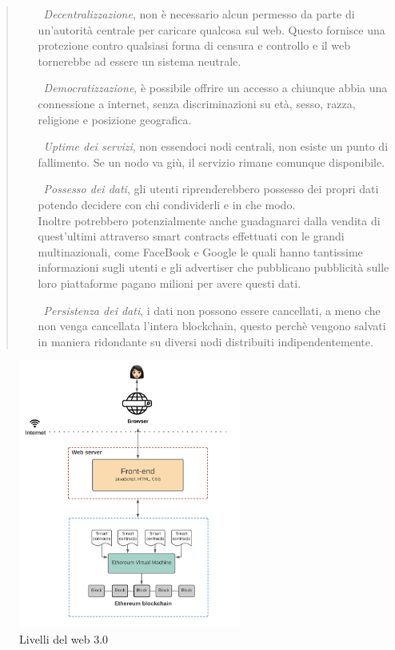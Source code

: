 \begin{quote}
    \begin{itemize}
        \item [\textbullet\ \textit{Decentralizzazione},] non è necessario alcun permesso da parte di un'autorità centrale per caricare qualcosa sul web. Questo fornisce una protezione contro qualsiasi forma di censura e controllo e il web tornerebbe ad essere un sistema neutrale.
        \item [\textbullet\ \textit{Democratizzazione},] è possibile offrire un accesso a chiunque abbia una connessione a internet, senza discriminazioni su età, sesso, razza, religione e posizione geografica.
        \item [\textbullet\ \textit{Uptime dei servizi},] non essendoci nodi centrali, non esiste un punto di fallimento. Se un nodo va giù, il servizio rimane comunque disponibile.
        \item [\textbullet\ \textit{Possesso dei dati},] gli utenti riprenderebbero possesso dei propri dati potendo decidere con chi condividerli e in che modo. 
        \\Inoltre potrebbero potenzialmente anche guadagnarci dalla vendita di quest'ultimi attraverso smart contracts effettuati con le grandi multinazionali, come FaceBook e Google le quali hanno tantissime informazioni sugli utenti e gli advertiser che pubblicano pubblicità sulle loro piattaforme pagano milioni per avere questi dati.
        \item [\textbullet\ \textit{Persistenza dei dati},] i dati non possono essere cancellati, a meno che non venga cancellata l'intera blockchain, questo perchè vengono salvati in maniera ridondante su diversi nodi distribuiti indipendentemente.
    \end{itemize}
\end{quote}
\begin{figure}[h]
    \caption{Livelli del web 3.0}
    \centering
    \includegraphics[width=0.65\textwidth]{Immagini/web_30.png}
\end{figure}
